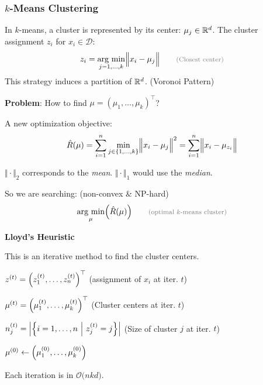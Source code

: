 \newpage

\subsubsection{$k$-Means Clustering}

In $k$-means, a cluster is represented by its center: $\mu_j \in \mathbb{R}^d$.
The cluster assignment $z_i$ for $x_i \in \mathcal{D}$:
$$
    z_i = \underset{j=1,\ldots,k}{\text{arg min}}\Bigl\Vert x_i-\mu_j \Bigr\Vert    \qquad {\color{gray}\footnotesize \text{(Closest center)} }
$$
{\footnotesize
    \remark This strategy induces a partition of $\mathbb{R}^d$. (Voronoi Pattern)
}

\textbf{Problem}: How to find $\mu = (\mu_1,\ldots,\mu_k)^\top$?

A new optimization objective:
$$
    \hat{R}(\mu) = \sum_{i=1}^n \underset{j\in\{1,\ldots,k\}}{\min}\Bigl\Vert x_i-\mu_j \Bigr\Vert^2 = \sum_{i=1}^n \Bigl\Vert x_i-\mu_{z_i} \Bigr\Vert
$$

{\footnotesize
    \remark $\Vert\cdot\Vert_2$ corresponds to the \textit{mean}. $\Vert\cdot\Vert_1$ would use the \textit{median}.
}

So we are searching: (non-convex \& NP-hard)
$$
    \underset{\mu}{\text{arg min}} \Bigl( \hat{R}(\mu) \Bigr) \qquad {\color{gray}\footnotesize \text{(optimal $k$-means cluster)}}
$$

\method \textbf{Lloyd's Heuristic}

This is an iterative method to find the cluster centers.

{\footnotesize
     $z^{(t)} = \Bigl( z_1^{(t)},\ldots,z_n^{(t)} \Bigr)^\top$ \color{gray}(assignment of $x_i$ at iter. $t$)\color{black}

     $\mu^{(t)} = \Bigl( \mu_1^{(t)},\ldots,\mu_k^{(t)}\Bigr)^\top$ \color{gray}(Cluster centers at iter. $t$)\color{black}

     $n_j^{(t)} = \Bigl| \Bigl\{ i=1,\ldots,n\ \Big|\ z_j^{(t)}=j \Bigr\} \Bigr|$ \color{gray}(Size of cluster $j$ at iter. $t$)\color{black}
}

\begin{algorithm}
    \caption{Lloyd's Heuristic}
    $\mu^{(0)}\gets \Bigl( \mu_1^{(0)},\ldots,\mu_k^{(0)} \Bigr)$\;
\end{algorithm}
{\footnotesize
    \remark Each iteration is in $\mathcal{O}\bigl( nkd \bigr)$.
}

